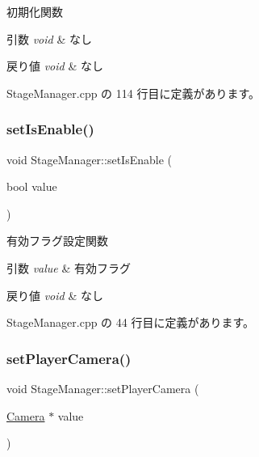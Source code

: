初期化関数 


\begin{DoxyParams}{引数}
{\em void} & なし \\
\hline
\end{DoxyParams}

\begin{DoxyRetVals}{戻り値}
{\em void} & なし \\
\hline
\end{DoxyRetVals}


 Stage\+Manager.\+cpp の 114 行目に定義があります。

\mbox{\label{class_stage_manager_a82938cb01ba1adbb3620fee0a12397ec}} 
\subsubsection{\texorpdfstring{set\+Is\+Enable()}{setIsEnable()}}
{\footnotesize\ttfamily void Stage\+Manager\+::set\+Is\+Enable (\begin{DoxyParamCaption}\item[{bool}]{value }\end{DoxyParamCaption})}



有効フラグ設定関数 


\begin{DoxyParams}{引数}
{\em value} & 有効フラグ \\
\hline
\end{DoxyParams}

\begin{DoxyRetVals}{戻り値}
{\em void} & なし \\
\hline
\end{DoxyRetVals}


 Stage\+Manager.\+cpp の 44 行目に定義があります。

\mbox{\label{class_stage_manager_a2c7f386ffc5087b8437abd5b881b7156}} 
\subsubsection{\texorpdfstring{set\+Player\+Camera()}{setPlayerCamera()}}
{\footnotesize\ttfamily void Stage\+Manager\+::set\+Player\+Camera (\begin{DoxyParamCaption}\item[{\mbox{\hyperlink{class_camera}{Camera}} $\ast$}]{value }\end{DoxyParamCaption})}



